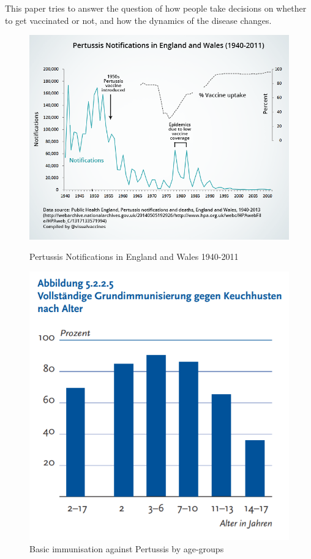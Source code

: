 \documentclass[11pt]{article}
\begin{document}
This paper tries to answer the question of how people take decisions on whether to get vaccinated or not, and how the dynamics of the disease changes. 

\begin{figure}
\centering
\begin{minipage}{.6\textwidth}
  \centering
  \includegraphics[height=0.7\linewidth]{ukpertussis}
  \caption{Pertussis Notifications in England \break
  and Wales 1940-2011}  
  \label{fig:test1}
  
\end{minipage}%
\begin{minipage}{.4\textwidth}
  \centering
  \includegraphics[height=1\linewidth]{grundimmodeutschlandpertussis}
  \caption{Basic immunisation against Pertussis by age-groups}
  \label{fig:test2}
 
\end{minipage}%
\end{figure}
\end{document}
